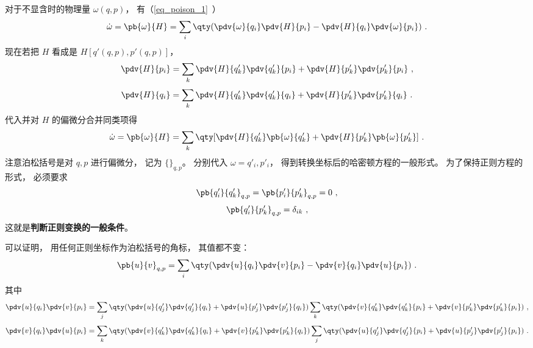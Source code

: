 对于不显含时的物理量 $\omega(q, p)$， 有（\autoref{eq_poison_1}~）
\begin{equation}
\dot \omega  = \pb{\omega}{H}  = \sum_i \qty(\pdv{\omega}{q_i}\pdv{H}{p_i} - \pdv{H}{q_i} \pdv{\omega}{p_i})~.
\end{equation}
现在若把 $H$ 看成是 $H[q'(q,p),p'(q,p)]$，  
\begin{equation}
\pdv{H}{p_i} = \sum_k \pdv{H}{q'_k} \pdv{q'_k}{p_i} + \pdv{H}{p'_k} \pdv{p'_k}{p_i}~,
\end{equation}
\begin{equation}
\pdv{H}{q_i} = \sum_k \pdv{H}{q'_k} \pdv{q'_k}{q_i} + \pdv{H}{p'_k} \pdv{p'_k}{q_i}~.
\end{equation}
代入并对 $H$ 的偏微分合并同类项得
\begin{equation}
\dot \omega  = \pb{\omega}{H} = \sum_k \qty[ \pdv{H}{q'_k} \pb{\omega}{q'_k} + \pdv{H}{p'_k} \pb{\omega}{p'_k}]~.
\end{equation}
注意泊松括号是对 $q,p$ 进行偏微分， 记为 $\{ {}\}_{q,p}$。  分别代入 $\omega  = q'_i, p'_i$，  得到转换坐标后的哈密顿方程的一般形式。 为了保持正则方程的形式， 必须要求
\begin{equation}
\pb{q'_i}{q'_k}_{q,p} = \pb{p'_i}{p'_k}_{q,p} = 0~,
\end{equation}
\begin{equation}\label{eq_ClsMec_2}
\pb{q'_i}{p'_k}_{q,p} = \delta_{ik}~,
\end{equation}
这就是\textbf{判断正则变换的一般条件}。

可以证明， 用任何正则坐标作为泊松括号的角标， 其值都不变：
\begin{equation}\label{eq_ClsMec_1}
\pb{u}{v}_{q,p} = \sum_i \qty( \pdv{u}{q_i}\pdv{v}{p_i} - \pdv{v}{q_i}\pdv{u}{p_i} ) ~.
\end{equation}
其中
\begin{equation}
\pdv{u}{q_i} \pdv{v}{p_i} = \sum_j \qty( \pdv{u}{q'_j} \pdv{q'_j}{q_i} + \pdv{u}{p'_j}\pdv{p'_j}{q_i} ) \sum_k \qty(\pdv{v}{q'_k}\pdv{q'_k}{p_i} + \pdv{v}{p'_k}\pdv{p'_k}{p_i}) ~,
\end{equation}
\begin{equation}
\pdv{v}{q_i} \pdv{u}{p_i} = \sum_k \qty( \pdv{v}{q'_k}\pdv{q'_k}{q_i} + \pdv{v}{p'_k}\pdv{p'_k}{q_i} ) \sum_j \qty(\pdv{u}{q'_j}\pdv{q'_j}{p_i} + \pdv{u}{p'_j}\pdv{p'_j}{p_i})~.
\end{equation}
 
